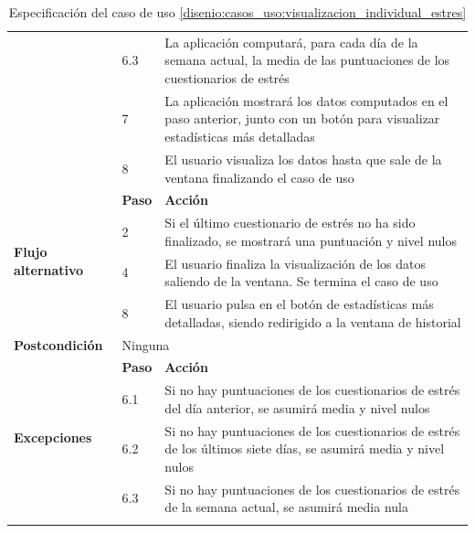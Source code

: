 \begin{table}[h]
\begin{tabularx}{\textwidth}{|l|l|X|}
                    \cline{2-3} & 6.3 & La aplicación computará, para cada día de la semana actual, la media de las puntuaciones de los cuestionarios de estrés \\
                    \cline{2-3} & 7 & La aplicación mostrará los datos computados en el paso anterior, junto con un botón para visualizar estadísticas más detalladas \\
                    \cline{2-3} & 8 & El usuario visualiza los datos hasta que sale de la ventana finalizando el caso de uso \\
                    \hline
                    \multirow{4}{*}{\textbf{Flujo alternativo}} & \textbf{Paso} & \textbf{Acción} \\
                    \cline{2-3} & 2 & Si el último cuestionario de estrés no ha sido finalizado, se mostrará una puntuación y nivel nulos \\
                    \cline{2-3} & 4 & El usuario finaliza la visualización de los datos saliendo de la ventana. Se termina el caso de uso \\
                    \cline{2-3} & 8 & El usuario pulsa en el botón de estadísticas más detalladas, siendo redirigido a la ventana de historial \\
                    \hline
                    \textbf{Postcondición} & \multicolumn{2}{|X|}{Ninguna} \\
                    \hline
                    \multirow{4}{*}{\textbf{Excepciones}}  & \textbf{Paso} & \textbf{Acción} \\
                    \cline{2-3} & 6.1 & Si no hay puntuaciones de los cuestionarios de estrés del día anterior, se asumirá media y nivel nulos \\
                    \cline{2-3} & 6.2 & Si no hay puntuaciones de los cuestionarios de estrés de los últimos siete días, se asumirá media y nivel nulos \\
                    \cline{2-3} & 6.3 & Si no hay puntuaciones de los cuestionarios de estrés de la semana actual, se asumirá media nula \\
                    \hline
                    \caption{Especificación del caso de uso \ref{disenio:casos_uso:visualizacion_individual_estres}}
                    \label{tabla:casos_uso:visualizacion_individual_estres}
                \end{tabularx}
            \end{table}

